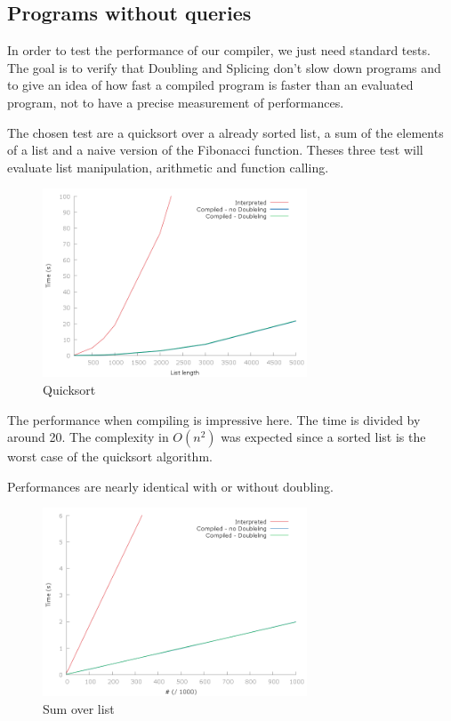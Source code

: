 \documentclass[11pt]{article}
\begin{document}
\subsection{Programs without queries}
In order to test the performance of our compiler, we just need standard tests. The goal is to verify that Doubling and Splicing don't slow down programs and to give an idea of how fast a compiled program is faster than an evaluated program, not to have a precise measurement of performances.

The chosen test are a quicksort over a already sorted list, a sum of the elements of a list and a naive version of the Fibonacci function. Theses three test will evaluate list manipulation, arithmetic and function calling.\newpage

\begin{figure}[!htbp]
  \centering
  \includegraphics[width=0.7\textwidth]{quicksort.png}
  \caption{Quicksort}
\end{figure}

The performance when compiling is impressive here. The time is divided by around 20. The complexity in $O(n^2)$ was expected since a sorted list is the worst case of the quicksort algorithm. 

Performances are nearly identical with or without doubling.

\begin{figure}[!htbp]
  \centering
  \includegraphics[width=0.7\textwidth]{sumlist.png}
  \caption{Sum over list}
\end{figure}
\end{document}
